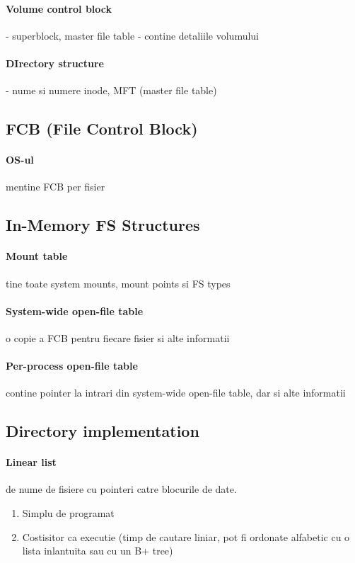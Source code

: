 \documentclass{article}
\begin{document}
\paragraph*{Volume control block} - superblock, master file table - contine detaliile volumului
\paragraph*{DIrectory structure} - nume si numere inode, MFT (master file table)

\subsection*{FCB (File Control Block)}
\paragraph*{OS-ul} mentine FCB per fisier

\subsection*{In-Memory FS Structures}
\paragraph*{Mount table} tine toate system mounts, mount points si FS types
\paragraph*{System-wide open-file table} o copie a FCB pentru fiecare fisier si alte informatii
\paragraph*{Per-process open-file table} contine pointer la intrari din system-wide open-file table, dar si alte informatii

\subsection*{Directory implementation}
\paragraph*{Linear list} de nume de fisiere cu pointeri catre blocurile de date.
\begin{enumerate}
    \item Simplu de programat
    \item Costisitor ca executie (timp de cautare liniar, pot fi ordonate alfabetic cu o lista inlantuita sau cu un B+ tree)
\end{enumerate}
\end{document}
